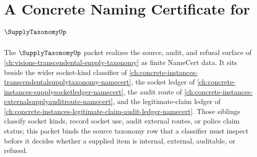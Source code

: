 \chapter{A Concrete Naming Certificate for $\SupplyTaxonomyUp$}
\label{ch:concrete-instances-supply-taxonomy-namecert}

The $\SupplyTaxonomyUp$ packet realizes the source, audit, and refusal surface of \autoref{ch:visions-transcendental-supply-taxonomy} as finite NameCert data. It sits beside the wider socket-kind classifier of \autoref{ch:concrete-instances-transcendentalsupplytaxonomy-namecert}, the socket ledger of \autoref{ch:concrete-instances-supplysocketledger-namecert}, the audit route of \autoref{ch:concrete-instances-externalsupplyauditroute-namecert}, and the legitimate-claim ledger of \autoref{ch:concrete-instances-legitimate-claim-audit-ledger-namecert}. Those siblings classify socket kinds, record socket use, audit external routes, or police claim status; this packet binds the source taxonomy row that a classifier must inspect before it decides whether a supplied item is internal, external, auditable, or refused.


